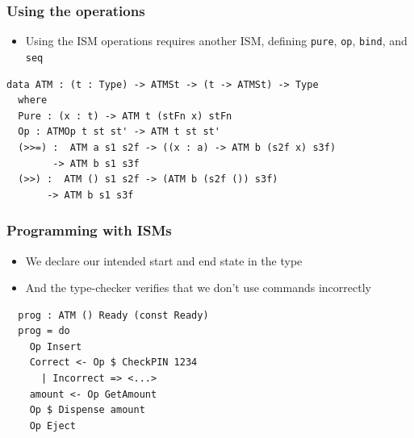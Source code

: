 \documentclass[compress,handout]{beamer}
\begin{document}
\begin{frame}[fragile]
  \frametitle{Using the operations}

  \begin{itemize}
    \item<1-> Using the ISM operations requires another ISM, defining
              \texttt{pure}, \texttt{op},
              \texttt{bind}, and \texttt{seq}
  \end{itemize}

  \pause

  \begin{verbatim}
data ATM : (t : Type) -> ATMSt -> (t -> ATMSt) -> Type
  where
  Pure : (x : t) -> ATM t (stFn x) stFn
  Op : ATMOp t st st' -> ATM t st st'
  (>>=) :  ATM a s1 s2f -> ((x : a) -> ATM b (s2f x) s3f)
        -> ATM b s1 s3f
  (>>) :  ATM () s1 s2f -> (ATM b (s2f ()) s3f)
       -> ATM b s1 s3f
  \end{verbatim}
\end{frame}


\begin{frame}[fragile]
  \frametitle{Programming with ISMs}

  \begin{itemize}
    \item<1-> We declare our intended start and end state in the type
    \item<2-> And the type-checker verifies that we don't use commands
              incorrectly
  \end{itemize}

  \pause

  \begin{center}
  \begin{minipage}{0.9\textwidth}
  \begin{verbatim}
  prog : ATM () Ready (const Ready)
  prog = do
    Op Insert
    Correct <- Op $ CheckPIN 1234
      | Incorrect => <...>
    amount <- Op GetAmount
    Op $ Dispense amount
    Op Eject
  \end{verbatim}
  \end{minipage}
  \end{center}

\end{frame}
\end{document}

